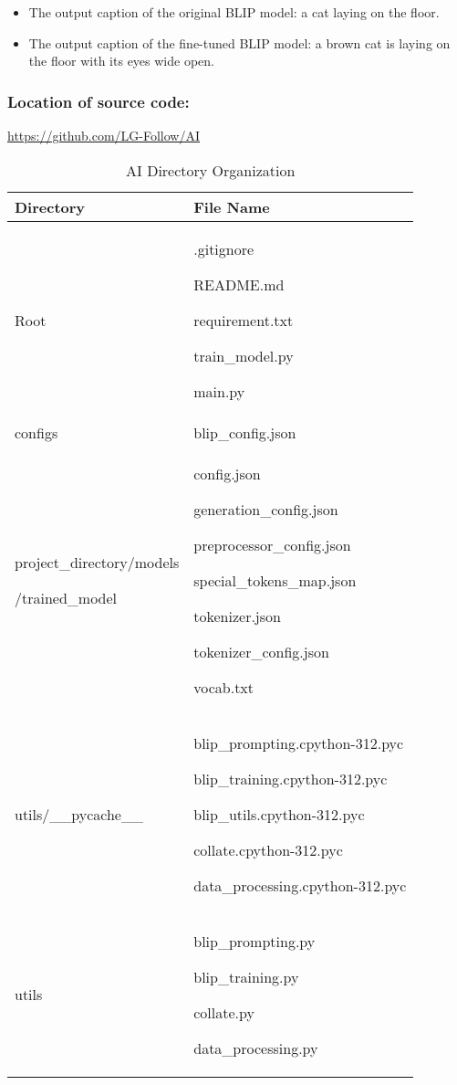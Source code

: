\documentclass[conference]{IEEEtran}
\begin{document}
\begin{itemize}
    \item The output caption of the original BLIP model: a cat laying on the floor.\\
    \item The output caption of the fine-tuned BLIP model: a brown cat is laying on the floor with its eyes wide open.\\
\end{itemize}


\subsubsection{Location of source code:}
\url{https://github.com/LG-Follow/AI}\\

\vspace{9cm}

\begin{table}[h!]
\caption{AI Directory Organization}
\def\arraystretch{1.4} \small
    \begin{tabular}{|p{4.1cm}|p{4.1cm}|}
        \hline
        Directory & File Name \\ \hline
        Root & .gitignore \par README.md \par requirement.txt
        \par train\_model.py \par main.py\\ \hline
        configs & blip\_config.json \par \\ \hline
        project\_directory/models \par /trained\_model & config.json \par generation\_config.json \par preprocessor\_config.json \par special\_tokens\_map.json \par tokenizer.json \par tokenizer\_config.json \par vocab.txt \\ \hline
        utils/\_\_pycache\_\_ & blip\_prompting.cpython-312.pyc \par blip\_training.cpython-312.pyc \par blip\_utils.cpython-312.pyc \par collate.cpython-312.pyc \par data\_processing.cpython-312.pyc \\ \hline
        utils & blip\_prompting.py \par blip\_training.py \par collate.py \par data\_processing.py \\ \hline
    \end{tabular}
\end{table}
\end{document}
